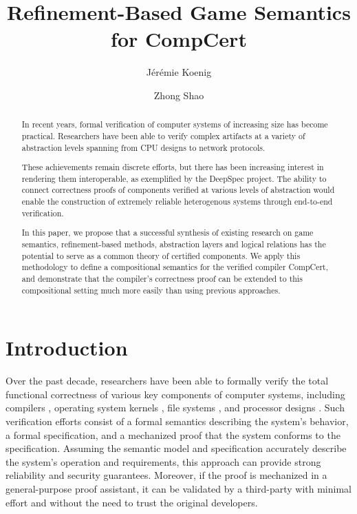 \documentclass[acmsmall,timestamp,review,anonymous]{acmart}
\title{Refinement-Based Game Semantics for CompCert}
\author{J\'er\'emie Koenig}
\affiliation{Yale University}
\author{Zhong Shao}
\affiliation{Yale University}
\begin{document}
\begin{abstract} %
In recent years,
formal verification of computer systems
of increasing size has become practical.
Researchers have been able to verify complex artifacts
at a variety of abstraction levels spanning
from CPU designs to network protocols.

These achievements remain discrete efforts, but
there has been increasing interest in rendering them interoperable,
as exemplified by the DeepSpec project.
The ability to connect correctness proofs of components
verified at various levels of abstraction
would enable the construction of extremely reliable heterogenous systems
through end-to-end verification.

In this paper,
we propose that a successful synthesis of existing research on
game semantics,
refinement-based methods,
abstraction layers and
logical relations
has the potential to serve as a common theory
of certified components.
We apply this methodology to define
a compositional semantics for the verified compiler
CompCert,
and demonstrate that
the compiler's correctness proof can be extended
to this compositional setting
much more easily than using previous approaches.
\end{abstract}

\maketitle

\section{Introduction} %


Over the past decade,
researchers have been able to formally verify the
total functional correctness
of various key components of computer systems,
including
compilers \cite{compcert, vellvm},
operating system kernels \cite{sel4, popl15},
file systems \cite{fscq}, and
processor designs \cite{safe}.
Such verification efforts
consist of
a formal semantics describing the system's behavior,
a formal specification,
and a mechanized proof that
the system conforms to the specification.
Assuming the semantic model and specification accurately describe
the system's operation and requirements,
this approach can provide
strong reliability and security guarantees.
Moreover,
if the proof is mechanized in a general-purpose proof assistant,
it can be validated by a third-party with minimal effort
and without the need to trust the original developers.
\end{document}

